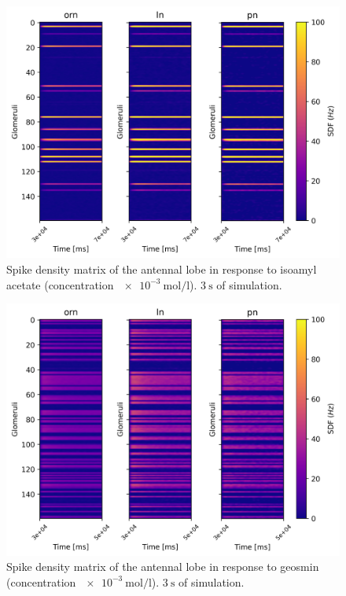 \begin{figure}
  \centering
  \includegraphics[width=\textwidth]{iaa}
  \caption{Spike density matrix of the antennal lobe in response to isoamyl acetate (concentration $\SI{e-3}{\mole\per\litre}$). $\SI{3}{\second}$ of simulation.}
  \label{fig:iaa}
\end{figure}

\begin{figure}
  \centering
  \includegraphics[width=\textwidth]{geosmin}
  \caption{Spike density matrix of the antennal lobe in response to geosmin (concentration $\SI{e-3}{\mole\per\litre}$). $\SI{3}{\second}$ of simulation.}
  \label{fig:geosmin}
\end{figure}

